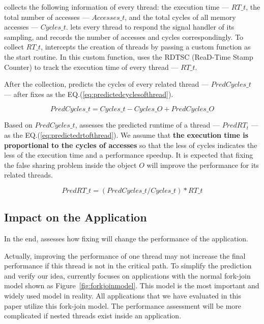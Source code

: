 \Cheetah{} collects the following information of every thread: the execution time --- $RT\_{t}$, the total number of accesses --- $Accesses\_{t}$, and the total cycles of all memory accesses --- $Cycles\_{t}$. \cheetah{} lets every thread to respond the signal handler of its sampling, and records the number of accesses and cycles correspondingly. To collect $RT\_{t}$, \cheetah{} intercepts the creation of threads by passing a custom function as the start routine. In this custom function, \cheetah{} uses the RDTSC (ReaD-Time Stamp Counter) to track the execution time of every thread --- $RT\_{t}$. 

After the collection, \cheetah{} predicts the cycles of every related thread --- $PredCycles\_{t}$ --- after fixes as the EQ.(\ref{eq:predictedcyclesofthread}). 

\begin{equation}
\label{eq:predictedcyclesofthread}
 PredCycles\_{t} = Cycles\_{t} - Cycles\_{O} + PredCycles\_{O} 
\end{equation} 
 
Based on $PredCycles\_{t}$, \cheetah{} assesses the predicted runtime of a thread --- $PredRT_{t}$ --- as the EQ.(\ref{eq:predictedrtofthread}). We assume that {\bf the execution time is proportional to the cycles of accesses} so that the less of cycles indicates the less of the execution time and a performance speedup. It is expected that fixing the false sharing problem inside the object $O$ will improve the performance for its related threads. 

\begin{equation}
\label{eq:predictedrtofthread}
 PredRT\_{t} = (PredCycles\_{t} / Cycles\_{t}) * RT\_{t} 
\end{equation} 

\subsection{Impact on the Application}
\label{sec:impactapp}

In the end, \cheetah{} assesses how fixing will change the performance of the application. 

Actually, improving the performance of one thread may not increase the final performance if this thread is not in the critical path.  To simplify the prediction and verify our idea, \cheetah{} currently focuses on applications with the normal fork-join model shown as Figure~\ref{fig:forkjoinmodel}. This model is the most important and widely used model in reality. All applications that we have evaluated in this paper utilize this fork-join model. The performance assessment will be more complicated if nested threads exist inside an application. 


